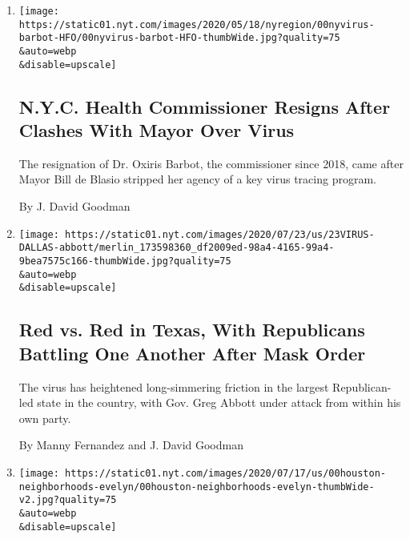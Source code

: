 \begin{enumerate}
\def\labelenumi{\arabic{enumi}.}
\item
  \href{/2020/08/04/nyregion/oxiris-barbot-health-commissioner-resigns.html}{}

  \texttt{[image: https://static01.nyt.com/images/2020/05/18/nyregion/00nyvirus-barbot-HFO/00nyvirus-barbot-HFO-thumbWide.jpg?quality=75\\\&auto=webp\\\&disable=upscale]}

  \hypertarget{nyc-health-commissioner-resigns-after-clashes-with-mayor-over-virus}{%
  \subsection{N.Y.C. Health Commissioner Resigns After Clashes With
  Mayor Over
  Virus}\label{nyc-health-commissioner-resigns-after-clashes-with-mayor-over-virus}}

  The resignation of Dr. Oxiris Barbot, the commissioner since 2018,
  came after Mayor Bill de Blasio stripped her agency of a key virus
  tracing program.

  By J. David Goodman
\item
  \href{/2020/07/23/us/coronavirus-texas-abbott-republicans.html}{}

  \texttt{[image: https://static01.nyt.com/images/2020/07/23/us/23VIRUS-DALLAS-abbott/merlin\_173598360\_df2009ed-98a4-4165-99a4-9bea7575c166-thumbWide.jpg?quality=75\\\&auto=webp\\\&disable=upscale]}

  \hypertarget{red-vs-red-in-texas-with-republicans-battling-one-another-after-mask-order}{%
  \subsection{Red vs. Red in Texas, With Republicans Battling One
  Another After Mask
  Order}\label{red-vs-red-in-texas-with-republicans-battling-one-another-after-mask-order}}

  The virus has heightened long-simmering friction in the largest
  Republican-led state in the country, with Gov. Greg Abbott under
  attack from within his own party.

  By Manny Fernandez and J. David Goodman
\item
  \href{/2020/07/21/us/coronavirus-houston-gulfton-bellaire.html}{}

  \texttt{[image: https://static01.nyt.com/images/2020/07/17/us/00houston-neighborhoods-evelyn/00houston-neighborhoods-evelyn-thumbWide-v2.jpg?quality=75\\\&auto=webp\\\&disable=upscale]}


\end{enumerate}
